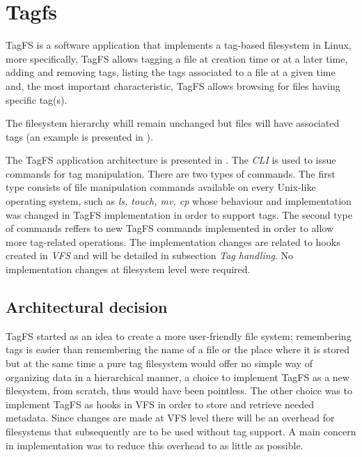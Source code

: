 \section{Tagfs}
    
TagFS is a software application that implements a tag-based filesystem in 
Linux, more specifically, TagFS allows tagging a file at creation time or at
a later time, adding and removing tags, listing the tags associated to a file
at a given time and, the most important characteristic, TagFS allows
browsing for files having specific tag(s).

The filesystem hierarchy whill remain unchanged but files will have
associated tags (an example is presented in ).

The TagFS application architecture is presented in . 
The \textit{CLI} is used to issue commands for tag manipulation. There are two types
of commands. The first type consists of file manipulation commands available on 
every Unix-like operating system, such as \textit{ls, touch, mv, cp} whose behaviour 
and implementation was changed in TagFS implementation in order to support tags. 
The second type of commands reffers to new TagFS commands implemented in order to 
allow more tag-related operations.  
The implementation changes are related to hooks created in \textit{VFS} and will be detailed in 
subsection \textit{Tag handling}. 
No implementation changes at filesystem level were required.

\subsection{Architectural decision}
TagFS started as an idea to create a more user-friendly file system; remembering
tags is easier than remembering the name of a file or the place where it is stored
but at the same time a pure tag filesystem would offer no simple way of organizing data 
in a hierarchical manner, a choice to implement TagFS as a new filesystem, from 
scratch, thus would have been pointless.
The other choice was to implement TagFS as hooks in
VFS in order to store and retrieve needed metadata.
Since changes are made at VFS level there will be an overhead for filesystems that
subsequently are to be used without tag support. A main concern in implementation
was to reduce this overhead to as little as possible.

